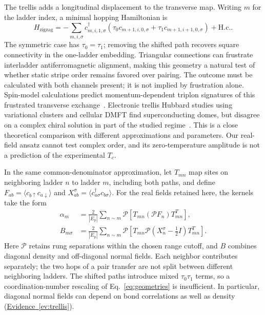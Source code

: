 \documentclass[11pt,letterpaper]{article}
\newcommand{\Ep}{E_{\mathrm p}}
\newcommand{\hc}{\mathrm{H.c.}}
\newcommand{\avg}[1]{\langle #1\rangle}
\newcommand{\ev}[1]{\hyperref[ev:#1]{Evidence~\ref*{ev:#1}}}
\begin{document}
The trellis adds a longitudinal displacement to the transverse map.
Writing $m$ for the ladder index, a minimal hopping Hamiltonian is
\begin{equation}
 H_{\mathrm{zigzag}}=-\sum_{m,i,\sigma}
 c^\dagger_{m,i,1,\sigma}
 \left(\tau_0 c_{m+1,i,0,\sigma}
       +\tau_1 c_{m+1,i+1,0,\sigma}\right)+\hc .
 \label{eq:trellis-hopping}
\end{equation}
The symmetric case has $\tau_0=\tau_1$; removing the shifted path recovers
square connectivity in the one-ladder embedding. Triangular connections can
frustrate interladder antiferromagnetic alignment, making this geometry a
natural test of whether static stripe order remains favored over pairing.
The outcome must be calculated with both channels present; it is not implied
by frustration alone. Spin-model calculations predict momentum-dependent
triplon signatures of this frustrated transverse exchange~\citep{SchmidtUhrig2007}.
Electronic trellis Hubbard studies using variational clusters and cellular
DMFT find superconducting domes, but disagree on a complex chiral solution
in part of the studied regime~\citep{Faye2015}. This is a close theoretical
comparison with different approximations and parameters. Our real-field
ansatz cannot test complex order, and its zero-temperature amplitude is not
a prediction of the experimental $T_c$.

In the same common-denominator approximation, let $T_{mn}$ map sites on
neighboring ladder $n$ to ladder $m$, including both paths, and define
$F_{ab}=\avg{c_{b\uparrow}c_{a\downarrow}}$ and
$X^\sigma_{ab}=\avg{c^\dagger_{a\sigma}c_{b\sigma}}$.
For the real fields retained here, the kernels take the form
\begin{align}
 \alpha_m&=\frac{2}{|\Ep|}\sum_{n\sim m}
 \mathcal P\!\left[T_{mn}(\mathcal P F_n)T_{mn}^{T}\right],\\
 B_{m\sigma}&=\frac{2}{|\Ep|}\sum_{n\sim m}
 \mathcal P\!\left[T_{mn}\mathcal P
 (X_n^\sigma-\tfrac12 I)T_{mn}^{T}\right].
 \label{eq:trellis-fields}
\end{align}
Here $\mathcal P$ retains rung separations within the chosen range cutoff,
and $B$ combines diagonal density and off-diagonal normal fields. Each
neighbor contributes separately; the two hops of a pair transfer are not
split between different neighboring ladders. The shifted paths introduce
mixed $\tau_0\tau_1$ terms, so a coordination-number rescaling of
Eq.~\eqref{eq:geometries} is insufficient. In particular, diagonal normal
fields can depend on bond correlations as well as density (\ev{trellis}).
\end{document}
